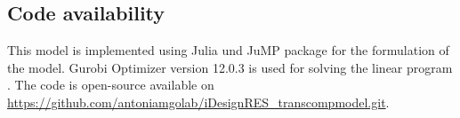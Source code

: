 \documentclass[preprint,10pt,review, authoryear]{elsarticle}
\begin{document}
    
    \subsection{Code availability}
    This model is implemented using Julia \citep{bezanson2017julia} und JuMP package \citep{Lubin2023} for the formulation of the model. Gurobi Optimizer version 12.0.3 is used for solving the linear program \citep{gurobi}. The code is open-source available on \url{https://github.com/antoniamgolab/iDesignRES_transcompmodel.git}.
     
    

\begin{table}[]
\centering
\caption{Sets, decision variables and parameters used for the formulation of the linear program. }
\label{tab: variables_and_parameters}
\end{table}
\end{document}
